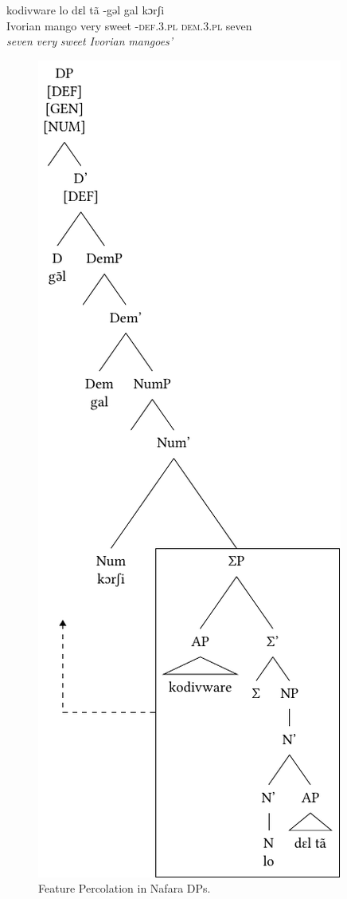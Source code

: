 \documentclass[output=paper]{langscibook}
\begin{document}
\ea\label{ex:baron:16}
kodivware lo dɛl tã -gəl gal kɔrʃi\\
   Ivorian mango very  sweet  -\textsc{def.3.pl} \textsc{dem.3.pl} seven  \\
 \textit{seven} \textit{very} \textit{sweet} \textit{Ivorian} \textit{mangoes’}
\z

\begin{figure}
\includegraphics{figures/baron-img3.pdf}
\caption{Feature Percolation in Nafara DPs.}
\label{fig:baron:3}
\end{figure}
\end{document}
